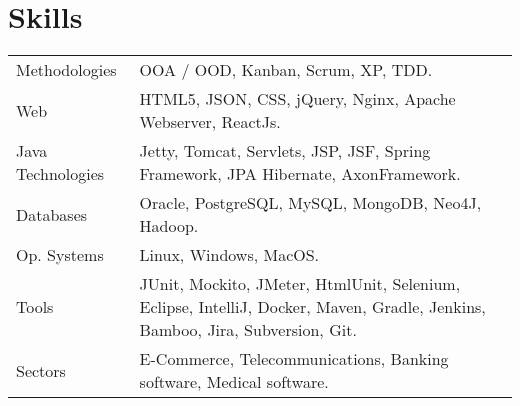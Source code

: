 \section*{Skills}
\begin{longtable}{@{}p{6cm}p{10cm}}
Methodologies 	    & OOA / OOD, Kanban, Scrum, XP, TDD.\\
Web         	    & HTML5, JSON, CSS, jQuery, Nginx, Apache Webserver, ReactJs.\\
Java Technologies	& Jetty, Tomcat, Servlets, JSP, JSF, Spring Framework, JPA Hibernate, AxonFramework.\\
Databases       	& Oracle, PostgreSQL, MySQL, MongoDB, Neo4J, Hadoop.\\
Op. Systems  	    & Linux, Windows, MacOS.\\
Tools   		    & JUnit, Mockito, JMeter, HtmlUnit, Selenium, Eclipse, IntelliJ, Docker, Maven, Gradle, Jenkins, Bamboo, Jira, Subversion, Git.\\
Sectors 		    & E-Commerce, Telecommunications, Banking software, Medical software.\\
\end{longtable}
